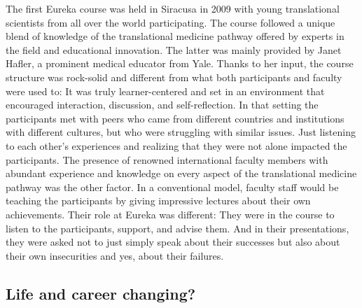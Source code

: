 \documentclass[authordate, editorial, issue]{jote-new-article}
\begin{document}
	The first Eureka course was held in Siracusa in 2009 with young translational scientists from all over the world participating. The course followed a unique blend of knowledge of the translational medicine pathway offered by experts in the field and educational innovation. The latter was mainly provided by Janet Hafler, a prominent medical educator from Yale. Thanks to her input, the course structure was rock-solid and different from what both participants and faculty were used to: It was truly learner-centered and set in an environment that encouraged interaction, discussion, and self-reflection. In that setting the participants met with peers who came from different countries and institutions with different cultures, but who were struggling with similar issues. Just listening to each other's experiences and realizing that they were not alone impacted the participants. The presence of renowned international faculty members with abundant experience and knowledge on every aspect of the translational medicine pathway was the other factor. In a conventional model, faculty staff would be teaching the participants by giving impressive lectures about their own achievements. Their role at Eureka was different: They were in the course to listen to the participants, support, and advise them. And in their presentations, they were asked not to just simply speak about their successes but also about their own insecurities and yes, about their failures.



	\subsection{Life and career changing?}
\end{document}
